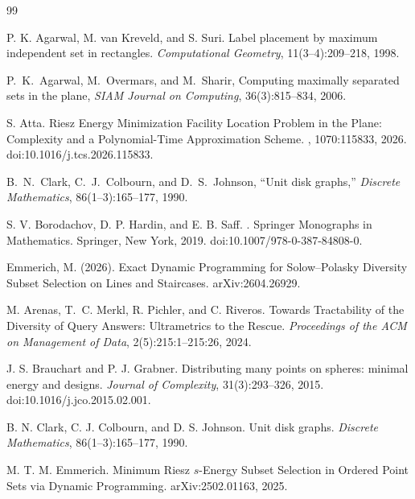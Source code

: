 \documentclass[11pt]{article}
\begin{document}
\begin{thebibliography}{99}

P. K. Agarwal, M. van Kreveld, and S. Suri.
\newblock Label placement by maximum independent set in rectangles.
\newblock \emph{Computational Geometry}, 11(3--4):209--218, 1998.

P.~K.~Agarwal, M.~Overmars, and M.~Sharir, Computing maximally separated sets in the plane,
\emph{SIAM Journal on Computing},
36(3):815--834, 2006.

S. Atta.
\newblock Riesz Energy Minimization Facility Location Problem in the Plane:
\newblock Complexity and a Polynomial-Time Approximation Scheme.
, 1070:115833, 2026.
\newblock doi:10.1016/j.tcs.2026.115833.

B.~N.~Clark, C.~J.~Colbourn, and D.~S.~Johnson,
``Unit disk graphs,''
\emph{Discrete Mathematics},
86(1--3):165--177, 1990.



S. V. Borodachov, D. P. Hardin, and E. B. Saff.
.
\newblock Springer Monographs in Mathematics.
\newblock Springer, New York, 2019.
\newblock doi:10.1007/978-0-387-84808-0.


 Emmerich, M. (2026). Exact Dynamic Programming for Solow--Polasky Diversity Subset Selection on Lines and Staircases. arXiv:2604.26929.

M. Arenas, T.~C. Merkl, R. Pichler, and C. Riveros.
Towards Tractability of the Diversity of Query Answers: Ultrametrics to the Rescue.
\emph{Proceedings of the ACM on Management of Data}, 2(5):215:1--215:26, 2024.

J. S. Brauchart and P. J. Grabner.
\newblock Distributing many points on spheres: minimal energy and designs.
\newblock \emph{Journal of Complexity}, 31(3):293--326, 2015.
\newblock doi:10.1016/j.jco.2015.02.001.

B. N. Clark, C. J. Colbourn, and D. S. Johnson.
\newblock Unit disk graphs.
\newblock \emph{Discrete Mathematics}, 86(1--3):165--177, 1990.

M. T. M. Emmerich.
\newblock Minimum Riesz $s$-Energy Subset Selection in Ordered Point Sets via Dynamic Programming.
\newblock arXiv:2502.01163, 2025.


\end{thebibliography}
\end{document}

